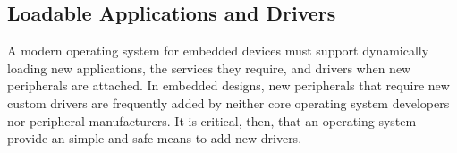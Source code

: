 


\subsection{Loadable Applications and Drivers}

A modern operating system for embedded devices must support dynamically
loading new applications, the services they require, and drivers when new
peripherals are attached.
In embedded designs, new peripherals that require new custom drivers are
frequently added by neither core operating system developers nor peripheral
manufacturers. It is critical, then, that an operating system provide an
simple and safe means to add new drivers.


